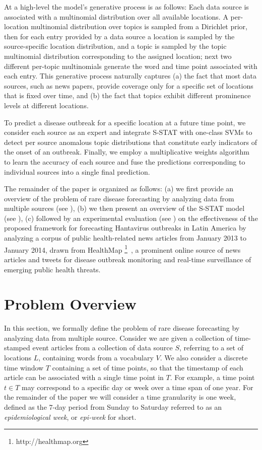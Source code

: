 \documentclass{sig-alternate}
\newcommand{\model}{{S-STAT}\xspace} %
\begin{document}
At a high-level the model's generative process is as follows: Each data source is associated with a multinomial distribution over all available locations. A per-location multinomial distribution over topics is sampled from a Dirichlet prior, then for each entry provided by a data source a location is sampled by the source-specific location distribution, and a topic is sampled by the topic multinomial distribution corresponding to the assigned location; next two different per-topic multinomials generate the word and time point associated with each entry. This generative process naturally captures (a) the fact that most data sources, such as news papers, provide coverage only for a specific set of locations that is fixed over time, and (b) the fact that topics exhibit different prominence levels at different locations.

To predict a disease outbreak for a specific location at a future time point, we consider each source as an expert and integrate \model with one-class SVMs to detect per source anomalous topic distributions that constitute early indicators of the onset of an outbreak. Finally, we employ a multiplicative weights algorithm to learn the accuracy of each source and fuse the predictions corresponding to individual sources into a single final prediction.

The remainder of the paper is organized as follows: (a) we first provide an overview of the problem of rare disease forecasting by analyzing data from multiple sources (see ), (b) we then present an overview of the \model model (see ), (c) followed by an experimental evaluation (see ) on the effectiveness of the proposed framework for forecasting Hantavirus outbreaks in Latin America by analyzing a corpus of public health-related news articles from January 2013 to January 2014, drawn from HealthMap \footnote{http://healthmap.org}~\cite{healthmap}, a prominent online source of news articles and tweets for disease outbreak monitoring and real-time surveillance of emerging public health threats.

\section{Problem Overview}
\label{sec:problem}

In this section, we formally define the problem of rare disease forecasting by analyzing data from multiple source. Consider we are given a collection of time-stamped event articles from a collection of data source $S$, referring to a set of locations $L$, containing words from a vocabulary $V$. We also consider a discrete time window $T$ containing a set of time points, so that the timestamp of each article can be associated with a single time point in $T$. For example, a time point $t \in T$ may correspond to a specific day or week over a time span of one year. For the remainder of the paper we will consider a time granularity is one week, defined as the 7-day period from Sunday to Saturday referred to as an {\em epidemiological week}, or {\em epi-week} for short.
\end{document}
